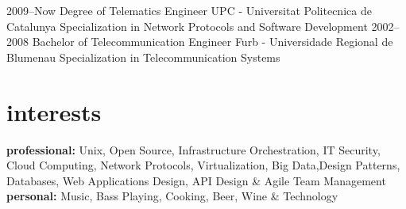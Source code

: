 \documentclass[]{friggeri-cv} %
\begin{document}
\begin{entrylist}
\entry
{2009--Now}
{Degree {\normalfont of Telematics Engineer}}
{UPC - Universitat Politecnica de Catalunya}
{Specialization in Network Protocols and Software Development}
\entry
{2002--2008}
{Bachelor {\normalfont of Telecommunication Engineer}}
{Furb -  Universidade Regional de Blumenau}
{Specialization in Telecommunication Systems}
\end{entrylist}


\section{interests}

\textbf{professional:} Unix, Open Source, Infrastructure Orchestration, IT Security, Cloud Computing, Network Protocols, Virtualization, Big Data,Design Patterns, Databases, Web Applications Design, API Design \& Agile Team Management \textbf{personal:} Music, Bass Playing, Cooking, Beer, Wine \& Technology 
\end{document}

